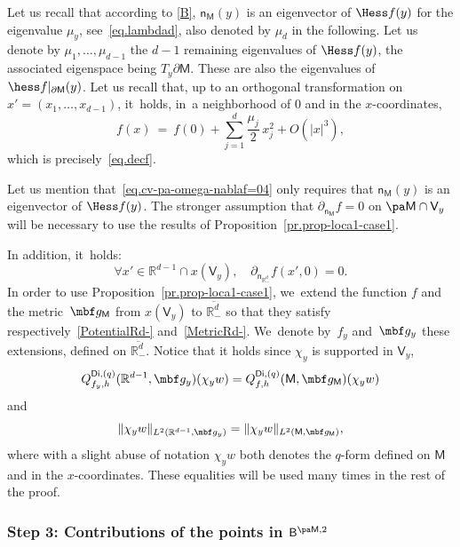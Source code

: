 Let us recall that according to \ref{B}, $\mathsf n_{\mathsf M}(y)$ is an eigenvector of $\Hess f(y)$ for the eigenvalue $\mu_y$, see~\eqref{eq.lambdad}, also denoted by $\mu_{d}$ in the following.
Let us denote by $\mu_1,\dots,\mu_{d-1}$ the $d-1$ remaining eigenvalues of
$\Hess f(y)$, the associated eigenspace being $T_y\partial \mathsf M$.
These are also the eigenvalues of $\hess f|_{\partial \mathsf M}(y)$.
Let us recall that, up to an orthogonal transformation on
$x'=(x_{1},\dots,x_{d-1})$, it~holds, in~a neighborhood of $0$ and in the $x$-coordinates,
\begin{equation}\label{eq.cv-pa-omega-nablaf=04}
f(x)\ =\ f(0)+ \sum_{j=1}^d \frac{\mu_j}{2} \, x_j^2+ O(\vert x\vert^3),
\end{equation}
which is precisely~\eqref{eq.decf}.
\begin{remark}
Let us mention that~\eqref{eq.cv-pa-omega-nablaf=04} only requires that $\mathsf n_{\mathsf M}(y)$ is an eigenvector of $\Hess f(y)$. The stronger assumption that $\partial_{\mathsf n_{\mathsf M}}f=0$ on $\pa \mathsf M\cap \mathsf V_y$ will be necessary to use the results of Proposition~\ref{pr.prop-loca1-case1}.
\end{remark}

In addition, it~holds:
\begin{equation}\label{eq.stable2}
\forall x'\in \mathbb R^{d-1} \cap x(\mathsf V_y), \quad \partial_{\mathsf n_{\mathbb R^d_-}}f(x',0)=0.
\end{equation}
In order to use Proposition~\ref{pr.prop-loca1-case1}, we~extend the function $f$ and the metric~$\mbf g_{\mathsf M}$ from $x(\mathsf V_y)$ to $\overline{\mathbb R^{d}_-}$ so that they satisfy respectively~\ref{PotentialRd-} and~\ref{MetricRd-}. We~denote by~$f_y$ and~$\mbf g_y$ these extensions, defined on $\overline{\mathbb R^d_-}$.
Notice that it holds since $\chi_y$ is supported in $\mathsf V_y$,
\[
Q_{f_y,h}^{\mathsf{Di},(q)}(\mathbb R^{d-1},\mbf g_y)(\chi_y
w)=Q_{f,h}^{\mathsf{Di},(q)}(\mathsf M,\mbf g_{\mathsf M})(\chi_y
w)
\]
and
\[
\Vert \chi_y w \Vert_{L^2(\mathbb R^{d-1},\mbf
g_y)}= \Vert \chi_y w \Vert_{L^2(\mathsf M,\mbf g_{\mathsf M})},
\]
where with a slight abuse of notation $\chi_y w$ both denotes the $q$-form defined on $\mathsf M$ and in the $x$-coordinates. These equalities will be used many times in the rest of the proof.

\subsubsection*{Step 3: Contributions of the points in $ \mathsf B^{\pa \mathsf M,2}$}

